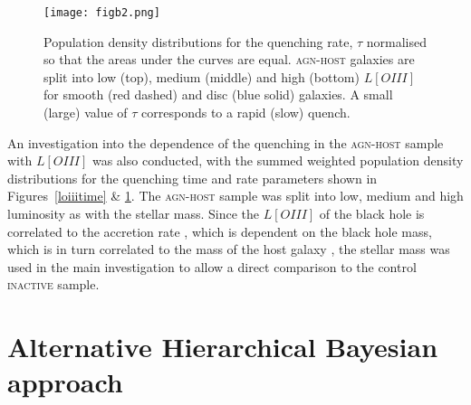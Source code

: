 \documentclass[useAMS,usenatbib]{mn2e}
\def\secondchange    {\color{srv} }
\begin{document}
\begin{figure}
\texttt{[image: figb2.png]}
\caption{{\secondchange Population density} distributions for the quenching rate, $\tau$ normalised so that the areas under the curves are equal. \textsc{agn-host} galaxies are split into low (top), medium (middle) and high (bottom) $L[OIII]$ for smooth (red dashed) and disc (blue solid) galaxies. A small (large) value of $\tau$ corresponds to a rapid (slow) quench.}
\label{loiiirate}
\end{figure}

An investigation into the dependence of the quenching in the \textsc{agn-host} sample with $L[OIII]$ was also conducted, with the summed weighted {\secondchange population density} distributions for the quenching time and rate parameters shown in Figures~\ref{loiiitime} \& \ref{loiiirate}. The \textsc{agn-host} sample was split into low, medium and high luminosity as with the stellar mass. Since the  $L[OIII]$ of the black hole is correlated to the accretion rate \citep{Kauff03b}, which is dependent on the black hole mass, which is in turn correlated to the mass of the host galaxy \citep{Mag98}, the stellar mass was used in the main investigation to allow a direct comparison to the control \textsc{inactive} sample. 


\section{Alternative Hierarchical Bayesian approach}\label{althyper}
\end{document}
